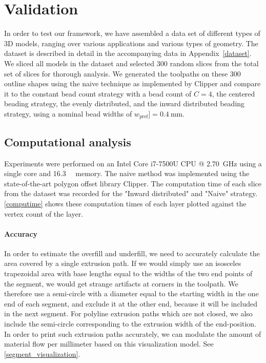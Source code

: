 \section{Validation}
In order to test our framework, we have assembled a data set of different types of 3D models, ranging over various applications and various types of geometry.
The dataset is described in detail in the accompanying data in Appendix~\ref{dataset}.
We sliced all models in the dataset and selected 300 random slices from the total set of slices for thorough analysis.
We generated the toolpaths on these 300 outline shapes using the naive technique as implemented by Clipper and compare it to the constant bead count strategy with a bead count of $C=4$, the centered beading strategy, the evenly distributed, and the inward distributed beading strategy, using a nominal bead widths of $w_\text{pref}] = \SI{0.4}{\milli\meter}$.


\subsection{Computational analysis}
Experiments were performed on an Intel Core i7-7500U CPU @ \SI{2.70}{\giga\hertz} using a single core and \SI{16.3}{\giga\byte} memory.
The naive method was implemented using the state-of-the-art polygon offset library Clipper. \cite{johnson2014clipper}
The computation time of each slice from the dataset was recorded for the "Inward distributed" and "Naive" strategy. 
\cref{computime} shows these computation times of each layer plotted against the vertex count of the layer.

\paragraph{Accuracy}
In order to estimate the overfill and underfill, we need to accurately calculate the area covered by a single extrusion path.
If we would simply use an isosceles trapezoidal area with base lengths equal to the widths of the two end points of the segment, we would get strange artifacts at corners in the toolpath.
We therefore use a semi-circle with a diameter equal to the starting width in the one end of each segment, and exclude it at the other end, because it will be included in the next segment.
For polyline extrusion paths which are not closed, we also include the semi-circle corresponding to the extrusion width of the end-position.
In order to print such extrusion paths accurately, we can modulate the amount of material flow per millimeter based on this visualization model.
See \cref{segment_visualization}.


